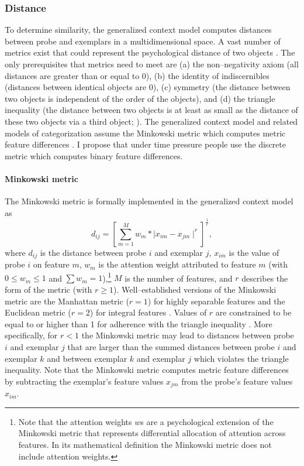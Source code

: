 \documentclass[a4paper,man,natbib]{apa6}
\begin{document}
\subsubsection{Distance}
To determine similarity, the generalized context model computes distances between probe and exemplars in a multidimensional space. A vast number of metrics exist that could represent the psychological distance of two objects \citep{deza2009encyclopedia}. The only prerequisites that metrics need to meet are (a) the non--negativity axiom (all distances are greater than or equal to 0), (b) the identity of indiscernibles (distances between identical objects are 0), (c) symmetry (the distance between two objects is independent of the order of the objects), and (d) the triangle inequality (the distance between two objects is at least as small as the distance of these two objects via a third object; \citealp{restle1959metric}). The generalized context model and related models of categorization assume the Minkowski metric which computes metric feature differences \citep{nosofsky1989further}. I propose that under time pressure people use the discrete metric which computes binary feature differences.

\paragraph{Minkowski metric}
The Minkowski metric is formally implemented in the generalized context model as
\begin{equation}
d_{ij} = \left[\sum\limits_{m=1}^M w_{m}*\mid x_{im} - x_{jm}\mid ^r\right]^\frac{1}{r},
\end{equation}
where $d_{ij}$ is the distance between probe $i$ and exemplar $j$, $x_{im}$ is the value of probe $i$ on feature $m$, $w_{m}$ is the attention weight attributed to feature $m$ (with $0 \leq w_{m} \leq 1$ and $\sum w_{m} = 1$),\footnote{Note that the attention weights $w$s are a psychological extension of the Minkowski metric that represents differential allocation of attention across features. In its mathematical definition the Minkowski metric does not include attention weights.} $M$ is the number of features, and $r$ describes the form of the metric (with $r \geq 1$). Well--established versions of the Minkowski metric are the Manhattan metric ($r = 1$) for highly separable features and the Euclidean metric ($r = 2$) for integral features \citep{shepard1964attention, nosofsky1986attention, garner1974processing}. Values of $r$ are constrained to be equal to or higher than 1 for adherence with the triangle inequality \citep{jakel2008similarity,francois2007concentration,tversky1982similarity,beals1968foundations, kress1989linear}. More specifically, for $r < 1$ the Minkowski metric may lead to distances between probe $i$ and exemplar $j$ that are larger than the summed distances between probe $i$ and exemplar $k$ and between exemplar $k$ and exemplar $j$ which violates the triangle inequality. Note that the Minkowski metric computes metric feature differences by subtracting the exemplar's feature values $x_{jm}$ from the probe's feature values $x_{im}$.
\end{document}
